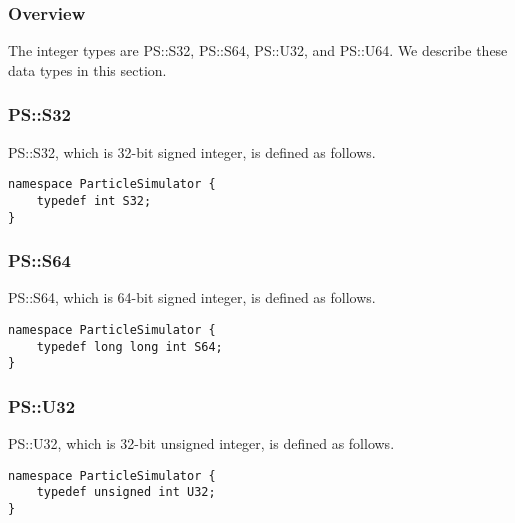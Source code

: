 \subsubsection{Overview}

The integer types are PS::S32, PS::S64, PS::U32, and PS::U64. We
describe these data types in this section.


\subsubsection{PS::S32}

PS::S32, which is 32-bit signed integer, is defined as follows.
\begin{lstlisting}[caption=S32]
namespace ParticleSimulator {
    typedef int S32;
}
\end{lstlisting}


\subsubsection{PS::S64}

PS::S64, which is 64-bit signed integer, is defined as follows.
\begin{lstlisting}[caption=S64]
namespace ParticleSimulator {
    typedef long long int S64;
}
\end{lstlisting}


\subsubsection{PS::U32}

PS::U32, which is 32-bit unsigned integer, is defined as follows.
\begin{lstlisting}[caption=U32]
namespace ParticleSimulator {
    typedef unsigned int U32;
}
\end{lstlisting}

